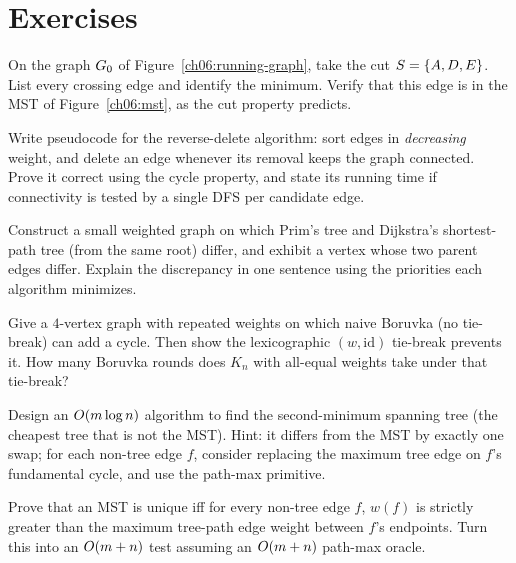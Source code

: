 \section*{Exercises}

\begin{exercise}
On the graph $G_0$ of Figure~\ref{ch06:running-graph}, take the cut $S=\{A,D,E\}$. List every crossing edge and identify the minimum. Verify that this edge is in the MST of Figure~\ref{ch06:mst}, as the cut property predicts.
\end{exercise}

\begin{exercise}
Write pseudocode for the reverse-delete algorithm: sort edges in \emph{decreasing} weight, and delete an edge whenever its removal keeps the graph connected. Prove it correct using the cycle property, and state its running time if connectivity is tested by a single DFS per candidate edge.
\end{exercise}

\begin{exercise}
Construct a small weighted graph on which Prim's tree and Dijkstra's shortest-path tree (from the same root) differ, and exhibit a vertex whose two parent edges differ. Explain the discrepancy in one sentence using the priorities each algorithm minimizes.
\end{exercise}

\begin{exercise}
Give a $4$-vertex graph with repeated weights on which naive Boruvka (no tie-break) can add a cycle. Then show the lexicographic $(w,\text{id})$ tie-break prevents it. How many Boruvka rounds does $K_n$ with all-equal weights take under that tie-break?
\end{exercise}

\begin{exercise}
Design an $O(m\log n)$ algorithm to find the second-minimum spanning tree (the cheapest tree that is not the MST). Hint: it differs from the MST by exactly one swap; for each non-tree edge $f$, consider replacing the maximum tree edge on $f$'s fundamental cycle, and use the path-max primitive.
\end{exercise}

\begin{exercise}
Prove that an MST is unique iff for every non-tree edge $f$, $w(f)$ is strictly greater than the maximum tree-path edge weight between $f$'s endpoints. Turn this into an $O(m+n)$ test assuming an $O(m+n)$ path-max oracle.
\end{exercise}

